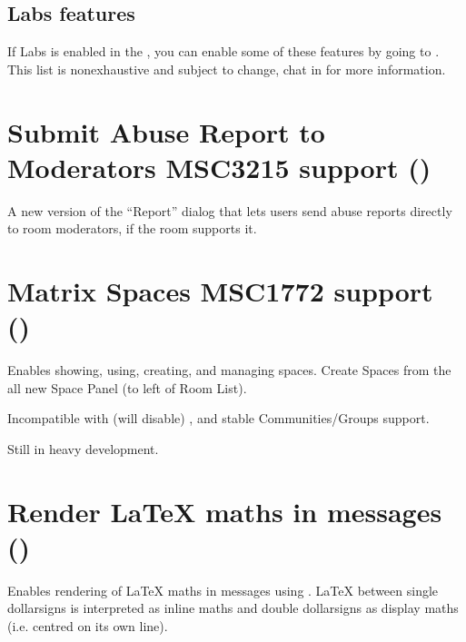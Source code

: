 \documentclass[letterpaper,10pt,openany,oneside,english]{sphinxmanual}
\begin{document}
\section{Labs features}
\label{\detokenize{labs:labs-features}}
\sphinxAtStartPar
If Labs is enabled in the , you can enable some of these features by going
to . This list is non\sphinxhyphen{}exhaustive and subject to change, chat in
 for more information.

\sphinxAtStartPar
{}


\chapter{Submit Abuse Report to Moderators MSC3215 support ()}
\label{\detokenize{labs:submit-abuse-report-to-moderators-msc3215-support-feature-report-to-moderators}}
\sphinxAtStartPar
A new version of the “Report” dialog that lets users send abuse reports directly to room moderators,
if the room supports it.


\chapter{Matrix Spaces MSC1772 support ()}
\label{\detokenize{labs:matrix-spaces-msc1772-support-feature-spaces}}
\sphinxAtStartPar
Enables showing, using, creating, and managing spaces. Create Spaces from the all new Space Panel (to left of Room List).

\sphinxAtStartPar
Incompatible with (will disable) ,  and stable Communities/Groups support.

\sphinxAtStartPar
Still in heavy development.


\chapter{Render LaTeX maths in messages ()}
\label{\detokenize{labs:render-latex-maths-in-messages-feature-latex-maths}}
\sphinxAtStartPar
Enables rendering of LaTeX maths in messages using . LaTeX between single dollar\sphinxhyphen{}signs is interpreted as inline maths and double dollar\sphinxhyphen{}signs as display maths (i.e. centred on its own line).
\end{document}
